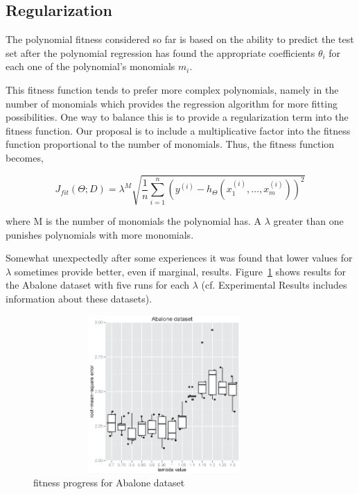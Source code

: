 \documentclass[a4paper, 12pt]{article}
\begin{document}
\subsection{Regularization}

The polynomial fitness considered so far is based on the ability to predict the test set after the polynomial regression has found the appropriate coefficients $\theta_i$ for each one of the polynomial's monomials $m_i$.

This fitness function tends to prefer more complex polynomials, namely in the number of monomials which provides the regression algorithm for more fitting possibilities. One way to balance this is to provide a regularization term into the fitness function. Our proposal is to include a multiplicative factor into the fitness function proportional to the number of monomials. Thus, the fitness function becomes,

$$
J_{fit}\left( \Theta; D \right) = \lambda^{M} \sqrt{ \frac{1}{n} \sum_{i=1}^n \left( y^{(i)} - h_{\Theta}\left(x_1^{(i)}, \ldots, x_m^{(i)}\right) \right)^2 }
$$

where M is the number of monomials the polynomial has. A $\lambda$ greater than one punishes polynomials with more monomials.

Somewhat unexpectedly after some experiences it was found that lower values for $\lambda$ sometimes provide better, even if marginal, results. Figure~\ref{Abalone_dataset_lambdas} shows results for the Abalone dataset with five runs for each $\lambda$ (cf. Experimental Results includes information about these datasets).

\begin{figure}[htb]
	\begin{center}
		\includegraphics[height=6cm,width=10cm,angle=0]
			{figures/Abalone_dataset_lambdas.eps}
		\caption{fitness progress for Abalone dataset}
		\label{Abalone_dataset_lambdas}
	\end{center}
\end{figure}
\end{document}
